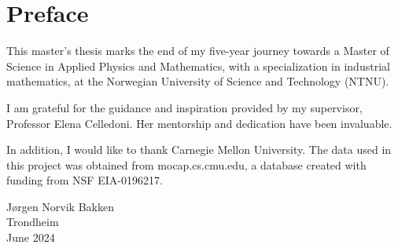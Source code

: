 \chapter*{Preface}

This master's thesis marks the end of my five-year journey towards a Master of Science in Applied Physics and Mathematics, with a specialization in industrial mathematics, at the Norwegian University of Science and Technology (NTNU).

I am grateful for the guidance and inspiration provided by my supervisor, Professor Elena Celledoni. Her mentorship and dedication have been invaluable.

In addition, I would like to thank Carnegie Mellon University. The data used in this project was obtained from mocap.cs.cmu.edu, a database created with funding from NSF EIA-0196217.

\begin{flushright}
    Jørgen Norvik Bakken\\
    Trondheim\\
    June 2024
\end{flushright}